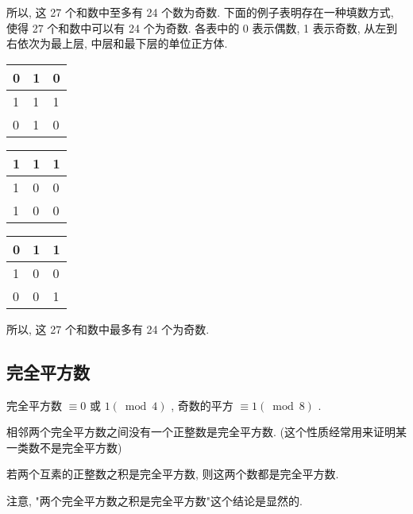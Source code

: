 \begin{solution}
	所以, 这 27 个和数中至多有 24 个数为奇数.
	下面的例子表明存在一种填数方式, 使得 27 个和数中可以有 24 个为奇数. 各表中的 0 表示偶数,  1 表示奇数, 从左到右依次为最上层, 中层和最下层的单位正方体.
	\begin{multicols}{3}
		\begin{center}
			\begin{tabular}{|l|l|l|}
				\hline
				0 & 1 & 0 \\ \hline
				1 & 1 & 1 \\ \hline
				0 & 1 & 0 \\ \hline
			\end{tabular}
		\end{center}
		\vspace{-0.5cm}
		\begin{center}
			\begin{tabular}{|l|l|l|}
				\hline
				1 & 1 & 1 \\ \hline
				1 & 0 & 0 \\ \hline
				1 & 0 & 0 \\ \hline
			\end{tabular}
		\end{center}
		\vspace{-0.5cm}
		\begin{center}
			\begin{tabular}{|l|l|l|}
				\hline
				0 & 1 & 1 \\ \hline
				1 & 0 & 0 \\ \hline
				0 & 0 & 1 \\ \hline
			\end{tabular}
		\end{center}
	\end{multicols}
	所以, 这 27 个和数中最多有 24 个为奇数.
\end{solution}

\subsection{完全平方数}
\begin{property}\label{prop:完全平方数-1}
	完全平方数 $\equiv 0$ 或 $1(\bmod 4)$ , 奇数的平方 $\equiv 1(\bmod 8)$ .
\end{property}
\begin{property}
	相邻两个完全平方数之间没有一个正整数是完全平方数. (这个性质经常用来证明某一类数不是完全平方数)
\end{property}
\begin{property}
	若两个互素的正整数之积是完全平方数, 则这两个数都是完全平方数.
\end{property}
注意, "两个完全平方数之积是完全平方数"这个结论是显然的.

